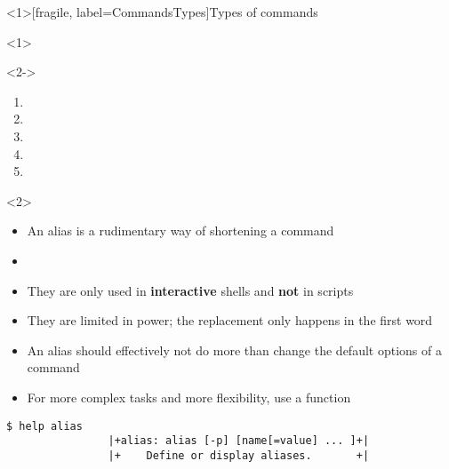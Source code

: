 \begin{frame}<1>[fragile, label=CommandsTypes]{Types of commands}
    \begin{onlyenv}<1>
        \begin{center}
        \end{center}
    \end{onlyenv}
    \vspace{-8mm}
    \begin{onlyenv}<2->
        \setlength{\columnsep}{-5mm}
        \begin{multicols}{5}
            \begin{enumerate}
                \item {}
                \item {}
                \item {}
                \item {}
                \item {}
            \end{enumerate}
        \end{multicols}
    \end{onlyenv}
    \vspace{-5mm}
    \begin{overlayarea}{\textwidth}{0.7\textheight}
        \begin{onlyenv}<2>
            \begin{itemize}
                \item An alias is a rudimentary way of shortening a command
                \item {}
                \item They are only used in \textbf{interactive} shells and \textbf{not} in scripts
                \item They are limited in power; the replacement only happens in the first word
                \item An alias should effectively not do more than change the default options of a command
                \item For more complex tasks and more flexibility, use a function
            \end{itemize}
            \begin{lstlisting}[style=MyBash]
                $ help alias
                |+alias: alias [-p] [name[=value] ... ]+|
                |+    Define or display aliases.       +|


\end{lstlisting}
\end{onlyenv}
\end{overlayarea}
\end{frame}
